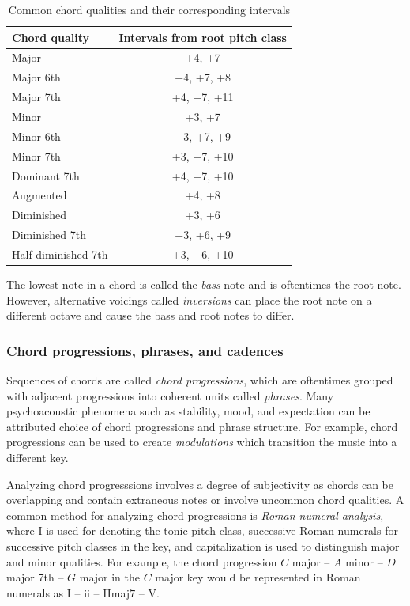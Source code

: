 \begin{table}[tb]
    \centering
    \begin{tabular}{lc}
        \toprule
        Chord quality & Intervals from root pitch class \\
        \midrule
        Major & +4, +7 \\
        Major 6th & +4, +7, +8 \\
        Major 7th & +4, +7, +11 \\
        Minor & +3, +7 \\
        Minor 6th & +3, +7, +9 \\
        Minor 7th & +3, +7, +10 \\
        Dominant 7th & +4, +7, +10 \\
        Augmented & +4, +8 \\
        Diminished & +3, +6 \\
        Diminished 7th & +3, +6, +9 \\
        Half-diminished 7th & +3, +6, +10 \\
        \bottomrule
    \end{tabular}
    \caption{Common chord qualities and their corresponding intervals \citep{freedman2015correlational}}
    \label{tab:chord-qualities}
\end{table}

The lowest note in a chord is called the \emph{bass} note and is oftentimes the
root note. However, alternative voicings called \emph{inversions} can place the
root note on a different octave and cause the bass and root notes to
differ.

\subsubsection{Chord progressions, phrases, and cadences}

Sequences of chords are called \emph{chord progressions}, which are oftentimes
grouped with adjacent progressions into coherent units called \emph{phrases}.
Many psychoacoustic phenomena such as stability, mood, and expectation can be
attributed choice of chord progressions and phrase structure. For example,
chord progressions can be used to create \emph{modulations} which transition
the music into a different key.

Analyzing chord progresssions involves a degree of subjectivity as chords can
be overlapping and contain extraneous notes or involve uncommon chord
qualities. A common method for analyzing chord progressions is \emph{Roman
numeral analysis}, where \RN{1} is used for denoting the tonic pitch class,
successive Roman numerals for successive pitch classes in the key, and
capitalization is used to distinguish major and minor qualities. For example,
the chord progression $C$ major -- $A$ minor -- $D$ major 7th -- $G$ major in
the $C$ major key would be represented in Roman numerals as \RN{1} -- \Rn{2} --
\RN{2}maj$7$ -- \RN{5}.


